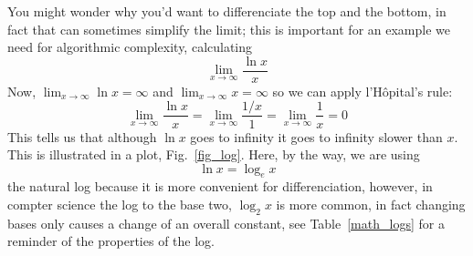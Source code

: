 \documentclass[11pt,a4paper]{scrartcl}
\begin{document}
You might wonder why you'd want to differenciate the top and the
bottom, in fact that can sometimes simplify the limit; this is
important for an example we need for algorithmic complexity, calculating
\begin{equation}
\lim_{x\rightarrow \infty}\frac{\ln{x}}{x}
\end{equation}
Now, $\lim_{x\rightarrow\infty}\ln{x}=\infty$ and $\lim_{x\rightarrow \infty}x=\infty$ so we can apply l'H\^{o}pital's rule:
\begin{equation}
\lim_{x\rightarrow \infty}\frac{\ln{x}}{x}=\lim_{x\rightarrow \infty}\frac{1/x}{1}=\lim_{x\rightarrow \infty}\frac{1}{x}=0
\end{equation}
This tells us that although $\ln{x}$ goes to infinity it goes to
infinity slower than $x$.  This is illustrated in a plot,
Fig.~\ref{fig_log}. Here, by the way, we are using
\begin{equation}
\ln{x}=\log_e{x}
\end{equation}
the natural log because it is more convenient for differenciation,
however, in compter science the log to the base two, $\log_2{x}$ is
more common, in fact changing bases only causes a change of an overall
constant, see Table~\ref{math_logs} for a reminder of the properties
of the log.
\end{document}
